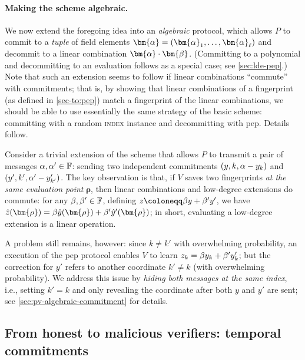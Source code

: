 \documentclass[10pt,a4paper]{article}
\newif\iflipics\lipicsfalse
\theoremstyle{definition}
\newcommand{\field}{\mathbb{F}}
\newcommand{\indexproblem}{\normalfont\textsc{index}\xspace}
\newcommand{\pepprotocol}{\textsf{pep}\xspace}
\newcommand{\pcommitstring}{y}
\newcommand{\fingerprinttuple}{\bm{\rho}}
\def\fe#1{
    \ifnum#1=1
        \alpha
    \else
    \ifnum#1=2
        \beta
    \else
    \ifnum#1=3
        \gamma
    \fi\fi\fi
}
\begin{document}
    \paragraph*{Making the scheme algebraic\iflipics\else.\fi} We now extend the foregoing idea into an \emph{algebraic} protocol, which allows $P$ to commit to a \emph{tuple} of field elements $\bm{\fe1} = (\bm{\fe1}_1, \ldots, \bm{\fe1}_\ell)$ and decommit to a linear combination $\bm{\fe1} \cdot \bm{\fe2}$. (Committing to a polynomial and decommitting to an evaluation follows as a special case; see \cref{sec:lde-pep}.) Note that such an extension seems to follow if linear combinations ``commute'' with commitments; that is, by showing that linear combinations of a fingerprint (as defined in \cref{sec-to:pep}) match a fingerprint of the linear combinations, we should be able to use essentially the same strategy of the basic scheme: committing with a random \indexproblem instance and decommitting with \pepprotocol. Details follow.
    
    Consider a trivial extension of the scheme that allows $P$ to transmit a pair of messages $\fe1, \fe1' \in \field$: sending two independent commitments $(\pcommitstring, k, \fe1 - \pcommitstring_k)$ and $(\pcommitstring', k', \fe1' - \pcommitstring'_{k'})$. The key observation is that, if $V$ saves two fingerprints \emph{at the same evaluation point} $\fingerprinttuple$, then linear combinations and low-degree extensions do commute: for any $\fe2, \fe2' \in \field$, defining $z \coloneqq \fe2 \pcommitstring + \fe2' \pcommitstring'$, we have $\hat z(\fingerprinttuple) = \fe2 \hat \pcommitstring(\fingerprinttuple) + \fe2' \hat \pcommitstring'(\fingerprinttuple)$; in short, evaluating a low-degree extension is a linear operation.
    
    A problem still remains, however: since $k \neq k'$ with overwhelming probability, an execution of the \pepprotocol protocol enables $V$ to learn $z_k = \fe2 \pcommitstring_k + \fe2' \pcommitstring'_k$; but the correction for $\pcommitstring'$ refers to another coordinate $k' \neq k$ (with overwhelming probability). We address this issue by \emph{hiding both messages at the same index}, i.e., setting $k' = k$ and only revealing the coordinate after both $\pcommitstring$ and $\pcommitstring'$ are sent; see \cref{sec:pv-algebraic-commitment} for details.

\subsection{From honest to malicious verifiers: temporal commitments}
\label{sec-to:vp-commitment}
\end{document}
